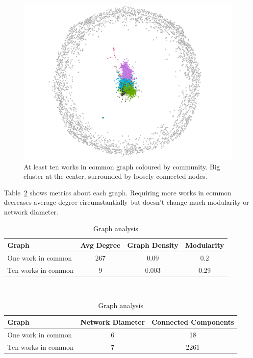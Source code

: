 \begin{figure}[!hbt]
	\begin{center}
	\includegraphics[width=\columnwidth]{graphics/atLeast10WorksCommunity.png}
	\caption{At least ten works in common graph coloured by community. Big cluster at the center, surrounded by loosely connected nodes.}
	\label{fig:graph10CommunityColoured}
	\end{center}
\end{figure}

Table~\ref{tab:graphComparision} shows metrics about each graph. Requiring more works in common decreases average degree circumstantially but doesn't change much modularity or network diameter.

\begin{table}[!hbt]
	\begin{center}
	\caption{Graph analysis}
	\label{tab:graphComparision}
	\begin{tabular}{|l|c|c|c|}
		\hline
		Graph & Avg Degree & Graph Density & Modularity \\
		\hline
		One work in common & 267 & 0.09 & 0.2 \\
		\hline
		Ten works in common & 9 & 0.003 & 0.29 \\
		\hline
	\end{tabular}\\
	\smallskip
	\begin{tabular}{|l|c|c|}
		\hline
		Graph & Network Diameter & Connected Components \\
		\hline
		One work in common & 6 & 18 \\
		\hline
		Ten works in common & 7 & 2261 \\
		\hline
	\end{tabular}
	\end{center}
\end{table}

